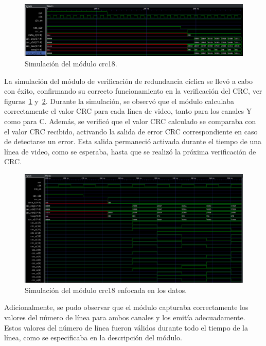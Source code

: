   \begin{figure}[h]
    \centering
    \includegraphics[width=1\textwidth]{./Figures/crc18.png}
    \caption{Simulación del módulo crc18.}\label{fig:crc18}
  \end{figure}

  La simulación del módulo de verificación de redundancia cíclica se llevó a cabo
  con éxito, confirmando su correcto funcionamiento en la verificación del CRC,
  ver figuras~\ref{fig:crc18} y~\ref{fig:crc18-z}\@.
  Durante la simulación, se observó que el módulo calculaba correctamente el
  valor CRC para cada línea de video, tanto para los canales Y como para C.
  Además, se verificó que el valor CRC calculado se comparaba con el valor CRC
  recibido, activando la salida de error CRC correspondiente en caso de detectarse
  un error. Esta salida permaneció activada durante el tiempo de una línea de
  video, como se esperaba, hasta que se realizó la próxima verificación de CRC\@.

  \begin{figure}[h]
    \centering
    \includegraphics[width=1\textwidth]{./Figures/crc18_zoom.png}
    \caption{Simulación del módulo crc18 enfocada en los datos.}\label{fig:crc18-z}
  \end{figure}

  Adicionalmente, se pudo observar que el módulo capturaba correctamente los
  valores del número de línea para ambos canales y los emitía adecuadamente.
  Estos valores del número de línea fueron válidos durante todo el tiempo de la
  línea, como se especificaba en la descripción del módulo.

